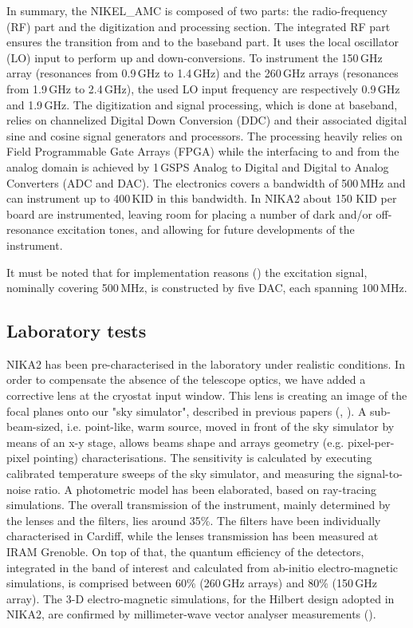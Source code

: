 \documentclass[]{aa} %
\begin{document}
In summary, the NIKEL\_AMC is composed of two parts: the radio-frequency (RF) part and the digitization and processing section.
The integrated RF part ensures the transition from and to the baseband part.
It uses the local oscillator (LO) input to perform up and down-conversions.
To instrument the 150\,GHz array (resonances from 0.9\,GHz to 1.4\,GHz) and the 260\,GHz arrays (resonances from 1.9\,GHz to 2.4\,GHz), the used LO input frequency are respectively 0.9\,GHz and 1.9\,GHz. The digitization and signal processing, which is done at baseband, relies on channelized Digital Down Conversion (DDC) and their associated digital sine and cosine signal generators and processors.
The processing heavily relies on Field Programmable Gate Arrays (FPGA) while the interfacing to and from the analog domain is achieved by 1\,GSPS Analog to Digital and Digital to Analog Converters (ADC and DAC).
The electronics covers a bandwidth of 500\,MHz and can instrument up to 400\,KID in this bandwidth. In NIKA2 about 150 KID per board are instrumented, leaving room for placing a number of dark and/or off-resonance excitation tones, and allowing for future developments of the instrument. 

It must be noted that for implementation reasons (\cite{Bourrion2012,Bourrion2016}) the excitation signal, nominally covering 500\,MHz, is constructed by five DAC, each spanning 100\,MHz.



\subsection{Laboratory tests}
\label{Laboratory tests}

NIKA2 has been pre-characterised in the laboratory under realistic conditions. In order to compensate the absence of the telescope optics, we have added a corrective lens at the cryostat input window. This lens is creating an image of the focal planes onto our "sky simulator", described in previous papers (\cite{Catalano2014}, \cite{Monfardini2011}). A sub-beam-sized, i.e. point-like, warm source, moved in front of the sky simulator by means of an x-y stage, allows beams shape and arrays geometry (e.g. pixel-per-pixel pointing) characterisations. The sensitivity is calculated by executing calibrated temperature sweeps of the sky simulator, and measuring the signal-to-noise ratio. A photometric model has been elaborated, based on ray-tracing simulations. The overall transmission of the instrument, mainly determined by the lenses and the filters, lies around 35\%. The filters have been individually characterised in Cardiff, while the lenses transmission has been measured at IRAM Grenoble. On top of that, the quantum efficiency of the detectors, integrated in the band of interest and calculated from ab-initio electro-magnetic simulations, is comprised between 60\% (260\,GHz arrays) and 80\% (150\,GHz array). The 3-D electro-magnetic simulations, for the Hilbert design adopted in NIKA2, are confirmed by millimeter-wave vector analyser measurements (\cite{Roesch2012}).
\end{document}
